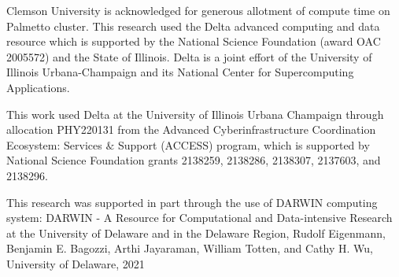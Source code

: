 Clemson University is acknowledged for generous allotment of compute time on Palmetto cluster. This research used the 
Delta advanced computing and data resource which is supported by the National Science Foundation (award OAC 2005572) 
and the State of Illinois. Delta is a joint effort of the University of Illinois Urbana-Champaign and its National 
Center for Supercomputing Applications. 

This work used Delta at the University of Illinois Urbana Champaign through allocation PHY220131 from the Advanced 
Cyberinfrastructure Coordination Ecosystem: Services $\&$ Support (ACCESS) program, which is supported by National 
Science Foundation grants 2138259, 2138286, 2138307, 2137603, and 2138296. 

This research was supported in part through the use of DARWIN computing system: DARWIN - A Resource for Computational 
and Data-intensive Research at the University of Delaware and in the Delaware Region, Rudolf Eigenmann, Benjamin E. 
Bagozzi, Arthi Jayaraman, William Totten, and Cathy H. Wu, University of Delaware, 2021